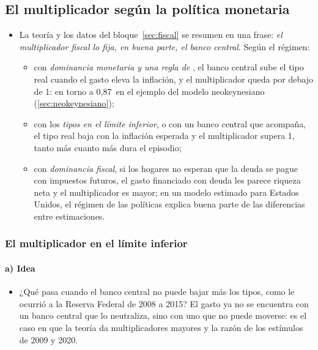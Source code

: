 \documentclass[11pt]{article}
\begin{document}
\subsection{El multiplicador según la política monetaria}\label{sec:multiplicador-elb}

\begin{itemize}
\item La teoría y los datos del bloque~\ref{sec:fiscal} se resumen en una frase: \emph{el multiplicador fiscal lo fija, en buena parte, el banco central}. Según el régimen:
  \begin{itemize}
  \item con \emph{dominancia monetaria y una regla de }, el banco central sube el tipo real cuando el gasto eleva la inflación, y el multiplicador queda por debajo de 1: en torno a 0,87~en el ejemplo del modelo neokeynesiano (\ref{sec:neokeynesiano});
  \item con los \emph{tipos en el límite inferior}, o con un banco central que acompaña, el tipo real baja con la inflación esperada y el multiplicador supera 1, tanto más cuanto más dura el episodio;
  \item con \emph{dominancia fiscal}, si los hogares no esperan que la deuda se pague con impuestos futuros, el gasto financiado con deuda les parece riqueza neta y el multiplicador es mayor; en un modelo estimado para Estados Unidos, el régimen de las políticas explica buena parte de las diferencias entre estimaciones\nocite{LeeperTraumWalker2017}.
  \end{itemize}
\end{itemize}

\subsubsection{El multiplicador en el límite inferior}\label{sec:multiplicador-limite}

\paragraph{a) Idea}

\begin{itemize}
\item ¿Qué pasa cuando el banco central no puede bajar más los tipos, como le ocurrió a la Reserva Federal de 2008 a 2015? El gasto ya no se encuentra con un banco central que lo neutraliza, sino con uno que no puede moverse: es el caso en que la teoría da multiplicadores mayores y la razón de los estímulos de 2009 y 2020.
\end{itemize}
\end{document}
